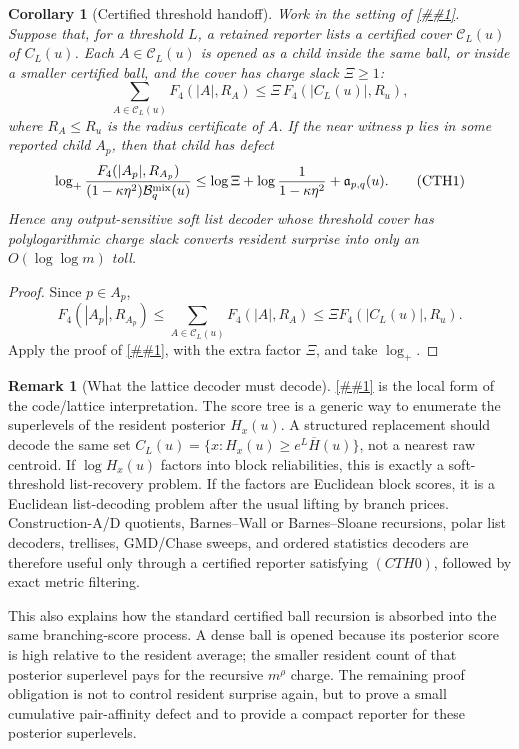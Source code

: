 \documentclass[10pt]{article}
\newcommand{\cref}[1]{\ref{##1}}
\newcommand{\Cref}[1]{\ref{##1}}
\newtheorem{corollary}[theorem]{Corollary}
\theoremstyle{definition}
\newtheorem{remark}[theorem]{Remark}
\begin{document}
\begin{corollary}[Certified threshold handoff]
   \label{cor:certified-threshold-handoff}
   Work in the setting of
   \cref{lem:posterior-superlevel-cancels-surprise}.  Suppose that, for a
   threshold \(L\), a retained reporter lists a certified cover
   \(\mathcal C_L(u)\) of \(C_L(u)\).  Each \(A\in\mathcal C_L(u)\) is opened as
   a child inside the same ball, or inside a smaller certified ball, and the
   cover has charge slack \(\Xi\ge1\):
   \[
      \sum_{A\in\mathcal C_L(u)} F_4(|A|,R_A)
      \le
      \Xi\,F_4(|C_L(u)|,R_u),
      \tag{CTH0}
   \]
   where \(R_A\le R_u\) is the radius certificate of \(A\).  If the near
   witness \(p\) lies in some reported child \(A_p\), then that child has defect
   \[
      \log_+
      \frac{F_4(|A_p|,R_{A_p})}
           {(1-\kappa\eta^2)\mathcal B_q^{\rm mix}(u)}
      \le
      \log\Xi
      +
      \log\frac1{1-\kappa\eta^2}
      +
      \mathfrak a_{p,q}(u).
      \tag{CTH1}
   \]
   Hence any output-sensitive soft list decoder whose threshold cover has
   polylogarithmic charge slack converts resident surprise into only an
   \(O(\log\log m)\) toll.
\end{corollary}

\begin{proof}
   Since \(p\in A_p\),
   \[
      F_4(|A_p|,R_{A_p})
      \le
      \sum_{A\in\mathcal C_L(u)}F_4(|A|,R_A)
      \le
      \Xi F_4(|C_L(u)|,R_u).
   \]
   Apply the proof of
   \cref{lem:posterior-superlevel-cancels-surprise}, with the extra factor
   \(\Xi\), and take \(\log_+\).
\end{proof}

\begin{remark}[What the lattice decoder must decode]
   \label{rem:posterior-superlevel-list-decoder-target}
   \Cref{cor:certified-threshold-handoff} is the local form of the
   code/lattice interpretation.  The score tree is a generic way to enumerate
   the superlevels of the resident posterior \(H_x(u)\).  A structured
   replacement should decode the same set
   \(C_L(u)=\{x:H_x(u)\ge e^L\overline H(u)\}\), not a nearest raw centroid.
   If \(\log H_x(u)\) factors into block reliabilities, this is exactly a
   soft-threshold list-recovery problem.  If the factors are Euclidean block
   scores, it is a Euclidean list-decoding problem after the usual lifting by
   branch prices.  Construction-A/D quotients, Barnes--Wall or Barnes--Sloane
   recursions, polar list decoders, trellises, GMD/Chase sweeps, and ordered
   statistics decoders are therefore useful only through a certified reporter
   satisfying \((CTH0)\), followed by exact metric filtering.

   This also explains how the standard certified ball recursion is absorbed
   into the same branching-score process.  A dense ball is opened because its
   posterior score is high relative to the resident average; the smaller
   resident count of that posterior superlevel pays for the recursive
   \(m^\rho\) charge.  The remaining proof obligation is not to control
   resident surprise again, but to prove a small cumulative pair-affinity
   defect and to provide a compact reporter for these posterior superlevels.
\end{remark}
\end{document}
